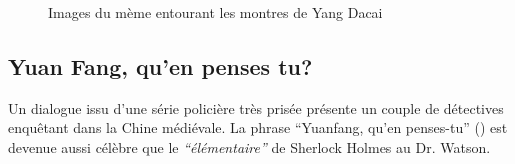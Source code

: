 \begin{figure}[h!]
    \caption{
      Images du mème entourant les montres de Yang Dacai
    }
\end{figure}

\clearpage

\subsection*{Yuan Fang, qu'en penses tu?}

Un dialogue issu d'une série policière très prisée présente un couple de détectives enquêtant dans la Chine médiévale. La phrase ``Yuanfang, qu'en penses-tu'' () est devenue aussi célèbre que le \textit{``élémentaire''} de Sherlock Holmes au Dr. Watson. 


